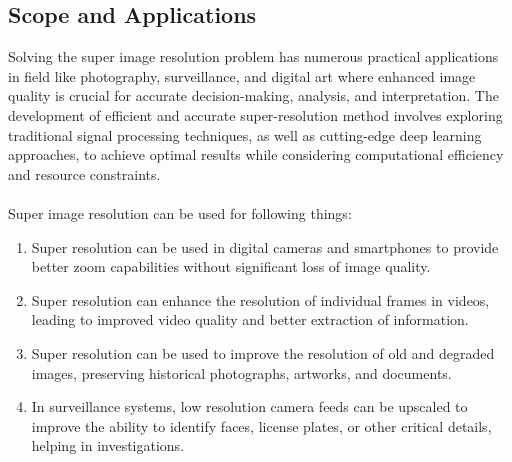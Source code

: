 \subsection{Scope and Applications}
Solving the super image resolution problem has numerous practical applications in field
like photography, surveillance, and digital art where enhanced image quality is crucial
for accurate decision-making, analysis, and interpretation. The development of efficient
and accurate super-resolution method involves exploring traditional signal processing
techniques, as well as cutting-edge deep learning approaches, to achieve optimal results
while considering computational efficiency and resource constraints.\\
\\
Super image resolution can be used for following things: 
\begin{enumerate}
    \item Super resolution can be used in digital cameras and smartphones to provide
    better zoom capabilities without significant loss of image quality.
    \item Super resolution can enhance the resolution of individual frames in videos,
    leading to improved video quality and better extraction of information. 
    \item Super resolution can be used to improve the resolution of old and degraded
    images, preserving historical photographs, artworks, and documents. 
    \item In surveillance systems, low resolution camera feeds can be upscaled to improve
    the ability to identify faces, license plates, or other critical details, helping in
    investigations. 
    
\end{enumerate}
